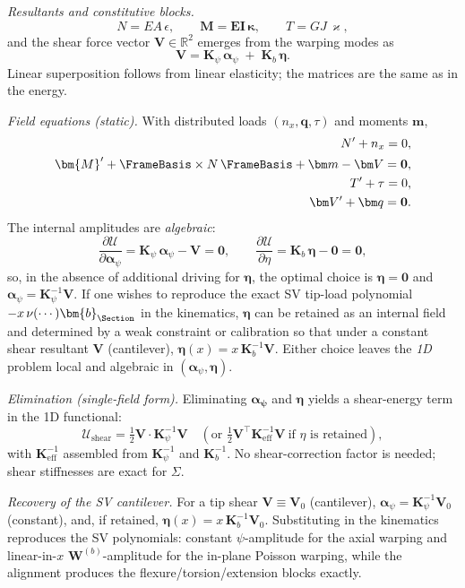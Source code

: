 \emph{Resultants and constitutive blocks.}\;
\[
N=EA\,\epsilon,\qquad
\bm{M}=\mathbf{EI}\,\bm{\kappa},\qquad
T=GJ\,\varkappa,
\]
and the shear force vector \(\bm V\in\mathbb{R}^2\) emerges from the warping modes as
\[
\bm V=\mathbf{K}_\psi\,\bm\alpha_{\psi}\;+\;\mathbf{K}_b\,\bm\eta.
\]
Linear superposition follows from linear elasticity; the matrices are the same as in the energy.

\emph{Field equations (static).}\;
With distributed loads \((n_x,\bm q,\tau)\) and moments \(\bm m\),
\[
\begin{aligned}
N'+n_x=0,\\
\bm{M}'+\FrameBasis\times N\,\FrameBasis+\bm m - \bm V=\mathbf{0},\\
T'+\tau=0,\\
\bm V'+\bm q=\mathbf{0}.
\end{aligned}
\]
The internal amplitudes are \emph{algebraic}:
\[
\frac{\partial \mathcal{U}}{\partial \bm\alpha_{\psi}}=\mathbf{K}_\psi\,\bm\alpha_{\psi}-\bm V=\mathbf{0},\qquad
\frac{\partial \mathcal{U}}{\partial \eta}=\mathbf{K}_b\,\bm\eta-\mathbf{0}=\mathbf{0},
\]
so, in the absence of additional driving for \(\bm{\eta}\), the optimal choice is \(\bm{\eta}=\mathbf{0}\) and \(\bm\alpha_{\psi}=\mathbf{K}_\psi^{-1}\bm V\).
If one wishes to reproduce the exact SV tip-load polynomial \(-x\,\nu(\cdots)\bm{b}_{\Section}\) in the kinematics, \(\bm{\eta}\) can be retained as an internal field and determined by a weak constraint or calibration so that under a constant shear resultant \(\bm V\) (cantilever), \(\bm{\eta}(x)=x\,\mathbf{K}_b^{-1}\bm V\).
Either choice leaves the \emph{1D} problem local and algebraic in \((\bm\alpha_{\psi},\bm\eta)\).

\emph{Elimination (single-field form).}\;
Eliminating \(\bm{\alpha_{\psi}}\) and \(\bm{\eta}\) yields a shear-energy term in the 1D functional:
\[
\mathcal{U}_\text{shear}=\tfrac{1}{2} \bm V \cdot \mathbf{K}_\psi^{-1}\bm V
\quad(\text{or } \tfrac{1}{2} \bm V^\top \mathbf{K}_\text{eff}^{-1}\bm V\ \text{if }\eta\text{ is retained}),
\]
with \(\mathbf{K}_\text{eff}^{-1}\) assembled from \(\mathbf{K}_\psi^{-1}\) and \(\mathbf{K}_b^{-1}\).
No shear-correction factor is needed; shear stiffnesses are exact for \(\Sigma\).

\emph{Recovery of the SV cantilever.}\;
For a tip shear \(\bm V\equiv \mathbf{V}_0\) (cantilever),
\(\bm\alpha_{\psi}=\mathbf{K}_\psi^{-1}\mathbf{V}_0\) (constant), and, if retained, \(\bm{\eta}(x)=x\,\mathbf{K}_b^{-1}\mathbf{V}_0\).
Substituting in the kinematics reproduces the SV polynomials:
constant \(\psi\)-amplitude for the axial warping and linear-in-\(x\) \(\bm{W}^{(b)}\)-amplitude for the in-plane Poisson warping,
while the alignment produces the flexure/torsion/extension blocks exactly.

